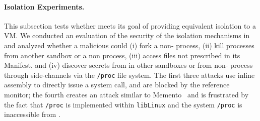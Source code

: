 \begin{comment}
In our design, only trusted applications such as system utilities can run as a non-\sysname{} \picoproc{}, as they need many more functionality that the \sysname{} Linux ABI support. From a security standpoint, nothing prevents a \sysname{} \picoprocs{} from acting maliciously, as application code runs unmodified in \sysname{}.  However, it is important to note that \sysname{}’s goal is not to secure a system but to isolate applications in a competitive level compared to the VM alternative. 
\end{comment}




\paragraph{Isolation Experiments.}
This subsection tests whether \sysname{} meets its goal of providing equivalent isolation
to a VM.
We conducted an evaluation of the security of the isolation mechanisms in \sysname{} and analyzed whether a malicious \sysname{} \picoproc{} could 
(i) fork a non-\sysname{} process, 
(ii)  kill processes from another sandbox or a non \sysname{} process, 
(iii) access files not prescribed in its Manifest, and 
(iv) discover secrets from \picoprocs{} in other sandboxes or from non-\sysname{} process through side-channels via the {\tt /proc} file system. 
The first three attacks use inline assembly to directly issue a system call, and are blocked by the reference monitor; the fourth creates
an attack similar to Memento~\citep{memento} and is frustrated by the fact that {\tt /proc} is implemented within {\tt libLinux} and
the system {\tt /proc} is inaccessible from \sysname{}.

